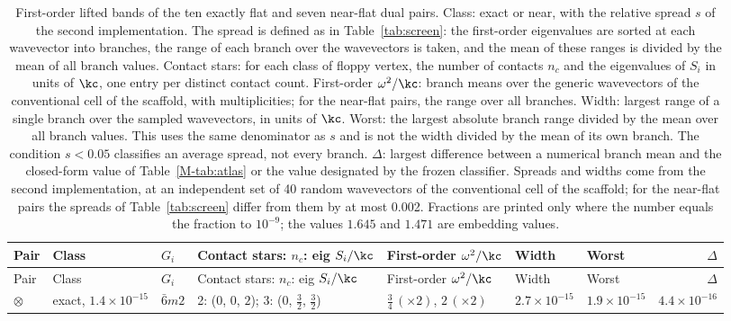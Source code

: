 \begingroup\scriptsize
\begin{longtable}{lllllllr}
\caption{First-order lifted bands of the ten exactly flat and seven near-flat dual pairs. Class: exact or near, with the relative spread $s$ of the second implementation. The spread is defined as in Table~\ref{tab:screen}: the first-order eigenvalues are sorted at each wavevector into branches, the range of each branch over the wavevectors is taken, and the mean of these ranges is divided by the mean of all branch values. Contact stars: for each class of floppy vertex, the number of contacts $n_c$ and the eigenvalues of $S_i$ in units of $\kc$, one entry per distinct contact count. First-order $\omega^2/\kc$: branch means over the generic wavevectors of the conventional cell of the scaffold, with multiplicities; for the near-flat pairs, the range over all branches. Width: largest range of a single branch over the sampled wavevectors, in units of $\kc$. Worst: the largest absolute branch range divided by the mean over all branch values. This uses the same denominator as $s$ and is not the width divided by the mean of its own branch. The condition $s<0.05$ classifies an average spread, not every branch. $\Delta$: largest difference between a numerical branch mean and the closed-form value of Table~\ref{M-tab:atlas} or the value designated by the frozen classifier. Spreads and widths come from the second implementation, at an independent set of 40 random wavevectors of the conventional cell of the scaffold; for the near-flat pairs the spreads of Table~\ref{tab:screen} differ from them by at most 0.002. Fractions are printed only where the number equals the fraction to $10^{-9}$; the values $1.645$ and $1.471$ are embedding values.}\label{tab:full_flat} \\
\hline Pair & Class & $G_i$ & \parbox[t]{3.0cm}{\strut\raggedright Contact stars: $n_c$: eig $S_i/\kc$\strut} & \parbox[t]{2.6cm}{\strut\raggedright First-order $\omega^2/\kc$\strut} & Width & Worst & $\Delta$ \\ \hline\endfirsthead
\hline Pair & Class & $G_i$ & \parbox[t]{3.0cm}{\strut\raggedright Contact stars: $n_c$: eig $S_i/\kc$\strut} & \parbox[t]{2.6cm}{\strut\raggedright First-order $\omega^2/\kc$\strut} & Width & Worst & $\Delta$ \\ \hline\endhead
\hline\endfoot
{}$\otimes$ & \parbox[t]{1.25cm}{\strut\raggedright exact, $1.4\times10^{-15}$\strut} & $\bar{6}m2$ & \parbox[t]{3.0cm}{\strut\raggedright 2: ($0$, $0$, $2$); 3: ($0$, $\tfrac{3}{2}$, $\tfrac{3}{2}$)\strut} & \parbox[t]{2.6cm}{\strut\raggedright $\tfrac{3}{4}\,(\times2)$, $2\,(\times2)$\strut} & $2.7\times10^{-15}$ & $1.9\times10^{-15}$ & $4.4\times10^{-16}$ \\

\end{longtable}

